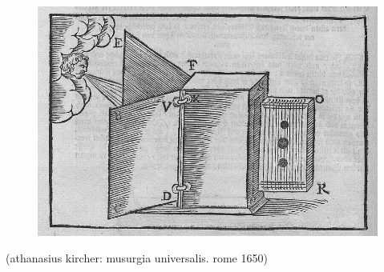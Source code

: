 \documentclass[12pt,a4paper,british,landscape]{article}
\begin{document}
\begin{figure}[h]
    \vspace{1.95cm}
    \begin{center}
        \includegraphics[scale=0.6]{ harp0.png }
    \end{center}
\end{figure}

\begin{center}
    (athanasius kircher: musurgia universalis. rome 1650)
\end{center}
\end{document}
